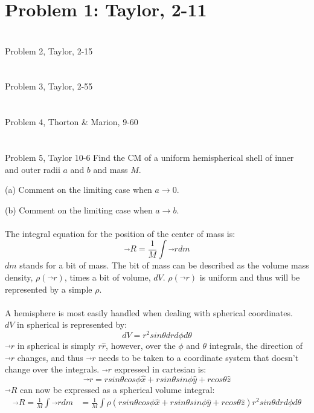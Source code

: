 \documentclass[a4paper,12pt]{article}
\newcommand{\F}[2]{\ensuremath{\frac{#1}{#2}}}
\newcommand{\V}{\ensuremath{\vec{\boldsymbol{}}}}
\newcommand{\Q}{\newpage \section*{}}
\begin{document}
\section*{Problem 1: Taylor, 2-11}


\Q{Problem 2, Taylor, 2-15}




\Q{Problem 3, Taylor, 2-55}

\Q{Problem 4, Thorton \& Marion, 9-60}

\Q{Problem 5, Taylor 10-6}
Find the CM of a uniform hemispherical shell of inner and outer radii $a$ and $b$ and mass $M$.

(a) Comment on the limiting case when $a\rightarrow 0$.

(b) Comment on the limiting case when $a\rightarrow b$.\\ \\
The integral equation for the position of the center of mass is:
\[\V{R}=\F{1}{M}\int\V{r}dm\]
$dm$ stands for a bit of mass.  The bit of mass can be described as the volume mass density, $\rho(\V{r})$, times a bit of volume, $dV$. $\rho(\V{r})$ is uniform and thus will be represented by a simple $\rho$.\\ \\
A hemisphere is most easily handled when dealing with spherical coordinates.\\
$dV$ in spherical is represented by:
\[dV=r^2sin\theta drd\phi d\theta\]
$\V{r}$ in spherical is simply $r\hat{r}$, however, over the $\phi$ and $\theta$ integrals, the direction of $\V{r}$ changes, and thus $\V{r}$ needs to be taken to a coordinate system that doesn't change over the integrals.
$\V{r}$ expressed in cartesian is:
\[\V{r}=rsin\theta cos\phi \hat{x}+rsin\theta sin\phi\hat{y}+rcos\theta\hat{z}\]
$\V{R}$ can now be expressed as a spherical volume integral:
\begin{align*}
\V{R}=\F{1}{M}\int\V{r}dm&=\F{1}{M}\int\rho(rsin\theta cos\phi \hat{x}+rsin\theta sin\phi\hat{y}+rcos\theta\hat{z})r^2sin\theta drd\phi d\theta
\end{align*}
\end{document}
